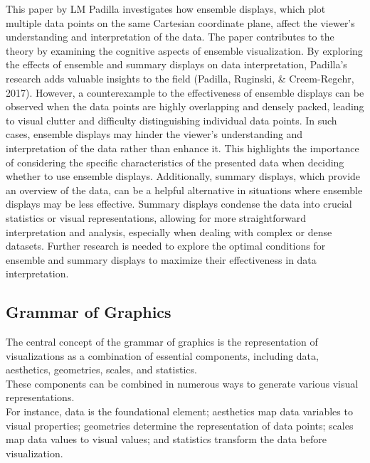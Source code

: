 \documentclass[print]{nuthesis}
\begin{document}
This paper by LM Padilla investigates how ensemble displays, which plot multiple data points on the same Cartesian coordinate plane, affect the viewer's understanding and interpretation of the data.
The paper contributes to the theory by examining the cognitive aspects of ensemble visualization.
By exploring the effects of ensemble and summary displays on data interpretation, Padilla's research adds valuable insights to the field (Padilla, Ruginski, \& Creem-Regehr, 2017).
However, a counterexample to the effectiveness of ensemble displays can be observed when the data points are highly overlapping and densely packed, leading to visual clutter and difficulty distinguishing individual data points.
In such cases, ensemble displays may hinder the viewer's understanding and interpretation of the data rather than enhance it.
This highlights the importance of considering the specific characteristics of the presented data when deciding whether to use ensemble displays.
Additionally, summary displays, which provide an overview of the data, can be a helpful alternative in situations where ensemble displays may be less effective.
Summary displays condense the data into crucial statistics or visual representations, allowing for more straightforward interpretation and analysis, especially when dealing with complex or dense datasets.
Further research is needed to explore the optimal conditions for ensemble and summary displays to maximize their effectiveness in data interpretation.

\hypertarget{grammar-of-graphics}{%
\subsection{Grammar of Graphics}\label{grammar-of-graphics}}

The central concept of the grammar of graphics is the representation of visualizations as a combination of essential components, including data, aesthetics, geometries, scales, and statistics.\\
These components can be combined in numerous ways to generate various visual representations.\\
For instance, data is the foundational element; aesthetics map data variables to visual properties; geometries determine the representation of data points; scales map data values to visual values; and statistics transform the data before visualization.
\end{document}
